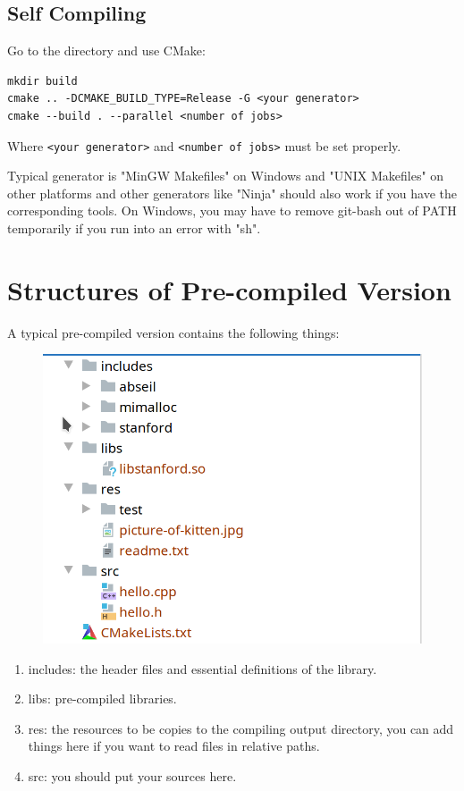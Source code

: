 \documentclass[a4paper,12pt]{report}
\begin{document}
\section{Self Compiling}
Go to the directory and use CMake:
\begin{verbatim}
mkdir build
cmake .. -DCMAKE_BUILD_TYPE=Release -G <your generator>
cmake --build . --parallel <number of jobs>
\end{verbatim}
Where \texttt{<your generator>} and  \texttt{<number of jobs>} must be set properly.

Typical generator is "MinGW Makefiles" on Windows and "UNIX Makefiles" on other platforms and other generators like "Ninja" should also work if you have the corresponding tools. On Windows, you may have to remove git-bash out of PATH temporarily if you run into an error with "sh".

\chapter{Structures of Pre-compiled Version}
A typical pre-compiled version contains the following things:
\begin{figure}[H] 
	\centering
	\includegraphics[width=\linewidth]{stru1}
\end{figure}
\begin{enumerate}
	\item includes: the header files and essential definitions of the library.
	\item libs: pre-compiled libraries.
	\item res: the resources to be copies to the compiling output directory, you can add things here if you want to read files in relative paths.
	\item src: you should put your sources here.
\end{enumerate}
\end{document}
